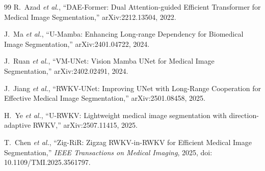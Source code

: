 \documentclass[conference]{IEEEtran}   %
\newcommand{\etal}{\textit{et al.}}
\begin{document}
\begin{thebibliography}{99}
R.~Azad \etal,
``DAE-Former: Dual Attention-guided Efficient Transformer for Medical Image Segmentation,'' arXiv:2212.13504, 2022.

J.~Ma \etal,
``U-Mamba: Enhancing Long-range Dependency for Biomedical Image Segmentation,'' arXiv:2401.04722, 2024.

J.~Ruan \etal,
``VM-UNet: Vision Mamba UNet for Medical Image Segmentation,'' arXiv:2402.02491, 2024.

J.~Jiang \etal,
``RWKV-UNet: Improving UNet with Long-Range Cooperation for Effective Medical Image Segmentation,'' arXiv:2501.08458, 2025.

H.~Ye \etal,
``U-RWKV: Lightweight medical image segmentation with direction-adaptive RWKV,'' arXiv:2507.11415, 2025.

T.~Chen \etal,
``Zig-RiR: Zigzag RWKV-in-RWKV for Efficient Medical Image Segmentation,''
\textit{IEEE Transactions on Medical Imaging}, 2025, doi: 10.1109/TMI.2025.3561797.

\end{thebibliography}
\end{document}
